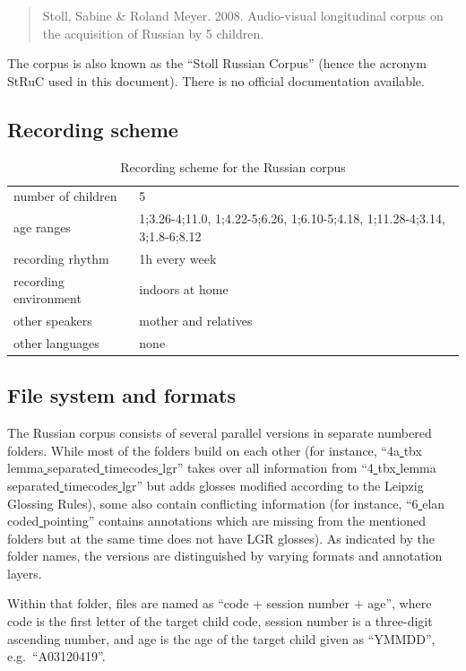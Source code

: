 \documentclass[a4paper, 11pt]{book}
\newcommand{\und}{\underline{{ }}\hspace{0.2mm}}	%
\begin{document}
\begin{quote}
	Stoll, Sabine \& Roland Meyer. 2008. Audio-visual longitudinal corpus on the acquisition of Russian by 5 children.
\end{quote}

\noindent The corpus is also known as the “Stoll Russian Corpus” (hence the acronym StRuC used in this document). There is no official documentation available. 


\subsection{Recording scheme}

\begin{table}[ht!]
	\centering
	\begin{tabular}{ll}
		\toprule
		number of children 	& 5 \\
		age ranges 			& 1;3.26-4;11.0, 1;4.22-5;6.26, 1;6.10-5;4.18, 1;11.28-4;3.14, 3;1.8-6;8.12 \\
		recording rhythm 	& 1h every week \\
		recording environment & indoors at home \\
		other speakers 		& mother and relatives \\
		other languages		& none \\
		\bottomrule
	\end{tabular}
	\caption{Recording scheme for the Russian corpus}
	\label{tab:Russian recording scheme}
\end{table}


\subsection{File system and formats}

The Russian corpus consists of several parallel versions in separate numbered folders. While most of the folders build on each other (for instance, “4a\und tbx\und lemma\und separated\und timecodes\und lgr” takes over all information from “4\und tbx\und lemma\und separated\und timecodes\und lgr” but adds glosses modified according to the Leipzig Glossing Rules), some also contain conflicting information (for instance, “6\und elan\und coded\und pointing” contains annotations which are missing from the mentioned folders but at the same time does not have LGR glosses). As indicated by the folder names, the versions are distinguished by varying formats and annotation layers. 

Within that folder, files are named as “code + session number + age”, where code is the first letter of the target child code, session number is a three-digit ascending number, and age is the age of the target child given as “YMMDD”, e.g.\ “A03120419”. 
\end{document}
